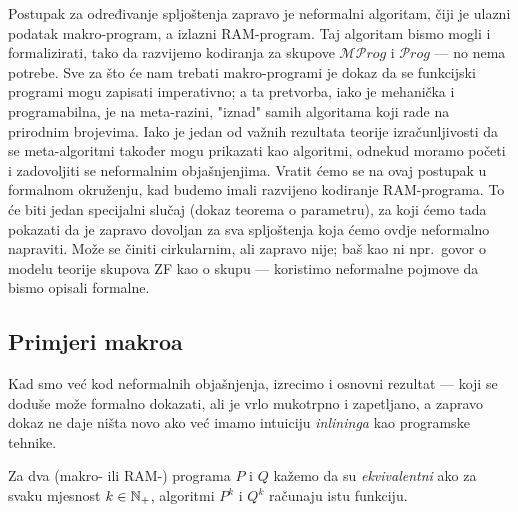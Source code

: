 Postupak za određivanje spljoštenja zapravo je neformalni algoritam, čiji je ulazni podatak makro-program, a izlazni RAM-program. Taj algoritam bismo mogli i formalizirati, tako da razvijemo kodiranja za skupove $\mathscr{MP}rog$ i $\mathscr Prog$ --- no nema potrebe. Sve za što će nam trebati makro-programi je dokaz da se funkcijski programi mogu zapisati imperativno; a ta pretvorba, iako je mehanička i programabilna, je na meta-razini, "iznad" samih algoritama koji rade na prirodnim brojevima. Iako je jedan od važnih rezultata teorije izračunljivosti da se meta-algoritmi također mogu prikazati kao algoritmi, odnekud moramo početi i zadovoljiti se neformalnim objašnjenjima. Vratit ćemo se na ovaj postupak u formalnom okruženju, kad budemo imali razvijeno kodiranje RAM-programa. To će biti jedan specijalni slučaj (dokaz teorema o parametru), za koji ćemo tada pokazati da je zapravo dovoljan za sva spljoštenja koja ćemo ovdje neformalno napraviti. Može se činiti cirkularnim, ali zapravo nije; baš kao ni npr.\ govor o modelu teorije skupova ZF kao o skupu --- koristimo neformalne pojmove da bismo opisali formalne.

\subsection{Primjeri makroa}

Kad smo već kod neformalnih objašnjenja, izrecimo i osnovni rezultat --- koji se doduše može formalno dokazati, ali je vrlo mukotrpno i zapetljano, a zapravo dokaz ne daje ništa novo ako već imamo intuiciju \emph{inlininga} kao programske tehnike.

\begin{definicija}[{name=[ekvivalentnost programa]}]\label{def:ekvprog}
Za dva (makro- ili RAM-\!) programa $P$ i $Q$ kažemo da su \emph{ekvivalentni} ako za svaku mjesnost $k\in{\mathbb N}_+$, algoritmi $P^k$ i $Q^k$ računaju istu funkciju.
\end{definicija}

